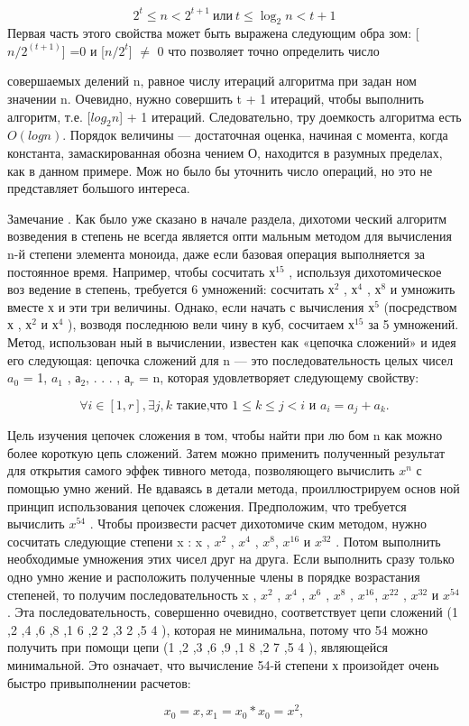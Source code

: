 \documentclass{mai_book}
\begin{document}
\begin{equation*}
  2^t \le n < 2^{t+1} \  {\text {или} }  \  t \le \log_2 n < t+1 
\end{equation*}
Первая часть этого свойства может быть выражена следующим обра­
зом: [$n/2^(t+1)$] =0 и [$n/2^t$] $\not=$ 0 что позволяет точно определить число

\newpage
совершаемых делений n, равное числу итераций алгоритма при задан­
ном значении n. Очевидно, нужно совершить t + 1 итераций, чтобы
выполнить алгоритм, т.е. [$log_2 n$] + 1 итераций. Следовательно, тру­
доемкость алгоритма есть $O(log n)$. Порядок величины — достаточная
оценка, начиная с момента, когда константа, замаскированная обозна­
чением О, находится в разумных пределах, как в данном примере. Мож­
но было бы уточнить число операций, но это не представляет большого
интереса.
\newline

\begin{center}
\parbox{12cm}{
Замечание . Как было уже сказано в начале раздела, дихотоми­
ческий алгоритм возведения в степень не всегда является опти­
мальным методом для вычисления n-й степени элемента моноида,
даже если базовая операция выполняется за постоянное время.
Например, чтобы сосчитать $х^15$ , используя дихотомическое воз­
ведение в степень, требуется 6 умножений: сосчитать $х^2$ , $х^4$ , $х^8$
и умножить вместе х и эти три величины. Однако, если начать с
вычисления $х^5$ (посредством х , $х^2$ и $х^4$ ), возводя последнюю вели­
чину в куб, сосчитаем $х^15$ за 5 умножений. Метод, использован­
ный в вычислении, известен как «цепочка сложений» и идея его
следующая: цепочка сложений для n — это последовательность
целых чисел $a_0$ = 1, $a_1$ , $а_2$, . . . , $а_r$ = n, которая удовлетворяет сле­дующему свойству:}
\end{center}
\[
\forall i\in [1,r], \exists j,k \text{ такие,что } 1\leqslant k \leqslant j<i {\text{ и  }} a_i    =a_j + a_k .
\]
\begin{center}
\parbox{12cm}{
Цель изучения цепочек сложения в том, чтобы найти при лю­
бом n как можно более короткую цепь сложений. Затем можно
применить полученный результат для открытия самого эффек­
тивного метода, позволяющего вычислить $x^n$ с помощью умно­
жений. Не вдаваясь в детали метода, проиллюстрируем основ­
ной принцип использования цепочек сложения. Предположим, что
требуется вычислить $x^{54}$ . Чтобы произвести расчет дихотомиче­
ским методом, нужно сосчитать следующие степени x : x , $x^{2}$ , $x^{4}$ ,
$x^{8}$, $x^{16}$ и $x^{32}$ . Потом выполнить необходимые умножения этих
чисел друг на друга. Если выполнить сразу только одно умно­
жение и расположить полученные члены в порядке возрастания
степеней, то получим последовательность x , $x^{2} $ , $x^{4}$ , $x^{6}$ , $x^{8}$ , $x^{16}$, $x^{22}$ , $x^{32}$ и $x^{54}$ . Эта последовательность, совершенно очевидно, со­ответствует цепи сложений (1 ,2 ,4 ,6 ,8 ,1 6 ,2 2 ,3 2 ,5 4 ), которая не
минимальна, потому что 54 можно получить при помощи це­пи (1 ,2 ,3 ,6 ,9 ,1 8 ,2 7 ,5 4 ), являющейся минимальной. Это означа­ет, что вычисление 54-й степени х произойдет очень быстро привыполнении расчетов:}
\end{center}
\[
x_0=x,  x_1=x_0*x_0=x^2 ,
\]
\newpage
\end{document}
